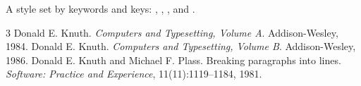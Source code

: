 \documentclass{article}
\begin{document}
A style set by keywords and keys: \citep{knuth84}, \citep{knuth84,knuth86},
\citep[p.~3]{plass81}, and \citet{plass81}.

\begin{thebibliography}{3}
 Donald E. Knuth. \emph{Computers and Typesetting, Volume A}. Addison-Wesley, 1984.
 Donald E. Knuth. \emph{Computers and Typesetting, Volume B}. Addison-Wesley, 1986.
 Donald E. Knuth and Michael F. Plass.
  Breaking paragraphs into lines. \emph{Software: Practice and Experience},
  11(11):1119--1184, 1981.
\end{thebibliography}
\end{document}
